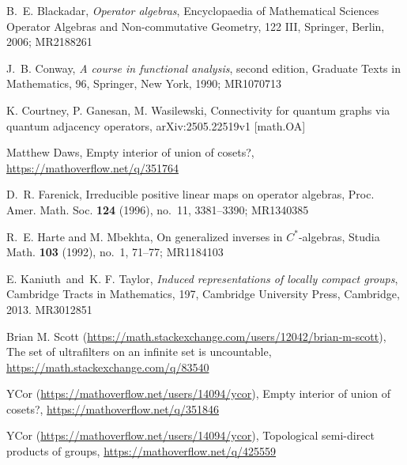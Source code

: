 \documentclass[twoside,a4paper,12pt]{article}
\theoremstyle{plain}
\theoremstyle{definition}
\begin{document}
\begin{thebibliography}{aa}

 B.~E. Blackadar, {\it Operator algebras}, Encyclopaedia of Mathematical Sciences Operator Algebras and Non-commutative Geometry, 122 III, Springer, Berlin, 2006; MR2188261

 J.~B. Conway, {\it A course in functional analysis}, second edition, 
Graduate Texts in Mathematics, 96, Springer, New York, 1990; MR1070713

 K. Courtney, P. Ganesan, M. Wasilewski, Connectivity for quantum graphs via quantum adjacency operators, arXiv:2505.22519v1 [math.OA]

 Matthew Daws, Empty interior of union of cosets?, 
   \url{https://mathoverflow.net/q/351764}

 D.~R. Farenick, Irreducible positive linear maps on operator algebras, Proc. Amer. Math. Soc. {\bf 124} (1996), no.~11, 3381--3390; MR1340385

 R.~E. Harte and M. Mbekhta, On generalized inverses in $C^*$-algebras, Studia Math. {\bf 103} (1992), no.~1, 71--77; MR1184103

 E. Kaniuth\ and\ K. F. Taylor, {\it Induced representations of locally compact groups}, Cambridge Tracts in Mathematics, 197, Cambridge University Press, Cambridge, 2013. MR3012851

 Brian M. Scott (\url{https://math.stackexchange.com/users/12042/brian-m-scott}), The set of ultrafilters on an infinite set is uncountable, \url{https://math.stackexchange.com/q/83540}

 YCor (\url{https://mathoverflow.net/users/14094/ycor}), Empty interior of union of cosets?,
   \url{https://mathoverflow.net/q/351846}

 YCor (\url{https://mathoverflow.net/users/14094/ycor}), Topological semi-direct products of groups,
   \url{https://mathoverflow.net/q/425559}

\end{thebibliography}
\end{document}

